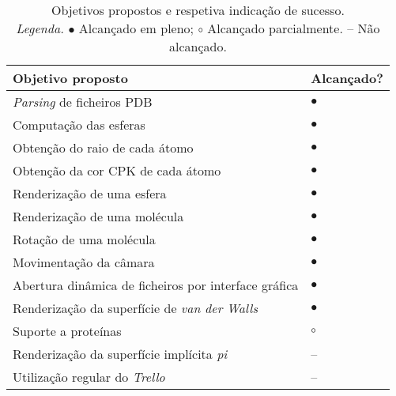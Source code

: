 \begin{table}[!htbp]
	\centering
	\begin{tabular}{p{} >{\centering\let\newline\\\arraybackslash\hspace{0pt}}m{}}
		\toprule
		{\bfseries Objetivo proposto} & {\bfseries Alcançado?} \\
		\midrule
		\textit{Parsing} de ficheiros \acs{PDB}              & $\bullet$ \\
		Computação das esferas                               & $\bullet$ \\
		Obtenção do raio de cada átomo                       & $\bullet$ \\
		Obtenção da cor CPK de cada átomo                    & $\bullet$ \\
		Renderização de uma esfera                           & $\bullet$ \\
		Renderização de uma molécula                         & $\bullet$ \\
		Rotação de uma molécula                              & $\bullet$ \\
		Movimentação da câmara                               & $\bullet$ \\
		Abertura dinâmica de ficheiros por interface gráfica & $\bullet$ \\
		Renderização da superfície de \textit{van der Walls} & $\bullet$ \\
        Suporte a proteínas                                  & $\circ$   \\
        Renderização da superfície implícita \textit{pi}     & --        \\
        Utilização regular do \textit{Trello}                & --        \\
		\bottomrule
	\end{tabular}
	\caption[Objetivos propostos vs. alcançados]{
		Objetivos propostos e respetiva indicação de sucesso.\\
		\textit{Legenda.} $\bullet$ Alcançado em pleno; $\circ$ Alcançado parcialmente. -- Não alcançado.
	}
	\label{tab::objetivos}
\end{table}


